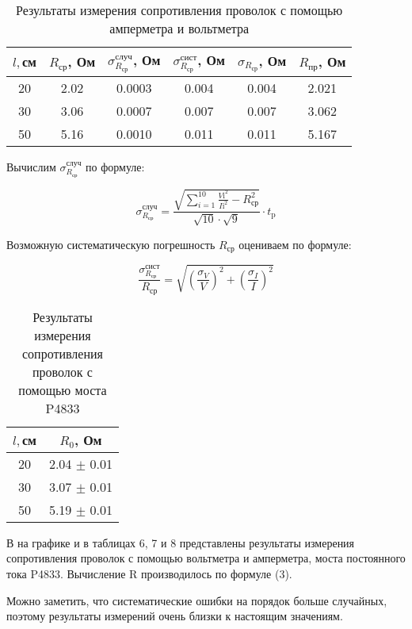\documentclass[a4paper,12pt]{article}
\begin{document}
\begin{table}[H]
\centering
\caption{Результаты измерения сопротивления проволок с помощью амперметра и вольтметра}
\begin{tabular}{|c|c|c|c|c|c|}
\hline
$l, $см & $R_{\mbox{ср}}$, Ом & $\sigma_{R_{\mbox{ср}}}^{\mbox{случ}}$, Ом & $\sigma_{R_{\mbox{ср}}}^{\mbox{сист}}$, Ом & $\sigma_{R_{\mbox{ср}}}$, Ом & $R_{\mbox{пр}}$, Ом\\
\hline
20 & 2.02 & 0.0003 & 0.004 & 0.004 & 2.021\\
\hline
30 & 3.06 & 0.0007 & 0.007 & 0.007 & 3.062\\
\hline
50 & 5.16 & 0.0010 & 0.011 & 0.011 & 5.167\\
\hline
\end{tabular}
\end{table}

Вычислим $\sigma_{R_{\mbox{ср}}}^{\mbox{случ}}$ по формуле:

\begin{equation}
\sigma_{R_{\mbox{ср}}}^{\mbox{случ}}=\frac{\sqrt{\sum_{i = 1}^{10}{\frac{V{\mbox{i}}^2}{I{\mbox{i}}^2}}-R_{\mbox{ср}}^2}}{\sqrt{10} \cdot \sqrt{9}} \cdot t_{\mbox{p}}
\end{equation}

Возможную систематическую погрешность $R_{\mbox{ср}}$ оцениваем по формуле:

\begin{equation}
\frac{\sigma_{R_{\mbox{ср}}}^{\mbox{сист}}}{R_{\mbox{ср}}}=\sqrt{\left( \frac{\sigma_V}{V} \right)^2+\left( \frac{\sigma_I}{I} \right)^2}
\end{equation}

\begin{table}[H]
\centering
\caption{Результаты измерения сопротивления проволок с помощью моста P4833}
\begin{tabular}{|c|c|}
\hline
$l, $см & $R_0$, Ом \\
\hline
20 & 2.04 $\pm$ 0.01 \\
\hline
30 & 3.07 $\pm$ 0.01 \\
\hline
50 & 5.19 $\pm$ 0.01 \\
\hline
\end{tabular}
\end{table}

В на графике и в таблицах 6, 7 и 8 представлены результаты измерения сопротивления проволок с помощью вольтметра и амперметра, моста постоянного тока P4833. Вычисление R производилось по формуле (3).

Можно заметить, что систематические ошибки на порядок больше случайных, поэтому  результаты измерений очень близки к настоящим значениям.
\end{document}
